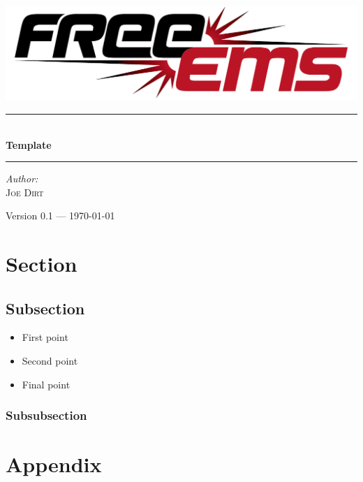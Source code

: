 \documentclass[12pt,a4paper,titlepage]{article}
\newcommand{\HRule}{\rule{\linewidth}{0.5mm}}
\begin{document}
\begin{titlepage} 
\begin{center}

\includegraphics[width=1\textwidth]{./logos/freeems}\\[1cm] \vfill

\HRule \\[0.8cm]
{ \huge \bfseries Template}\\[0.4cm]
\HRule \vfill

\Large \emph{Author:}\\
\textsc{Joe Dirt} \vfill

{\large Version 0.1 --- \today}

\end{center}
\end{titlepage} 


\tableofcontents
\thispagestyle{empty}
\pagebreak

\section {Section }

\subsection{Subsection }

\begin{itemize}
\item First point
\item Second point
\item Final point
\end{itemize}

\subsubsection{Subsubsection }

\appendix

\section{Appendix }
\end{document}
